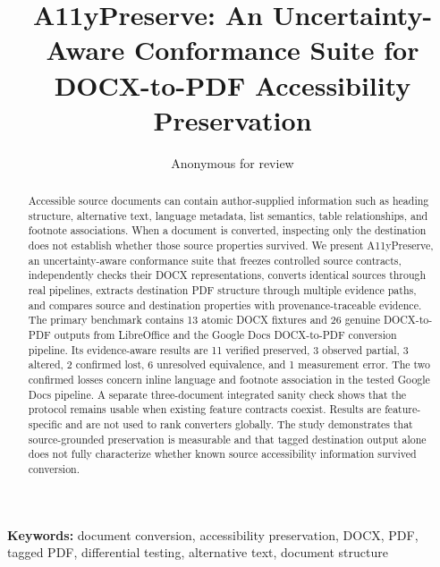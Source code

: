 \documentclass[10pt,twocolumn]{article}
\title{A11yPreserve: An Uncertainty-Aware Conformance Suite for DOCX-to-PDF Accessibility Preservation}
\author{Anonymous for review}
\date{}
\begin{document}
\maketitle

\begin{abstract}
Accessible source documents can contain author-supplied information such as heading structure, alternative text, language metadata, list semantics, table relationships, and footnote associations. When a document is converted, inspecting only the destination does not establish whether those source properties survived. We present A11yPreserve, an uncertainty-aware conformance suite that freezes controlled source contracts, independently checks their DOCX representations, converts identical sources through real pipelines, extracts destination PDF structure through multiple evidence paths, and compares source and destination properties with provenance-traceable evidence. The primary benchmark contains 13 atomic DOCX fixtures and 26 genuine DOCX-to-PDF outputs from LibreOffice and the Google Docs DOCX-to-PDF conversion pipeline. Its evidence-aware results are 11 verified preserved, 3 observed partial, 3 altered, 2 confirmed lost, 6 unresolved equivalence, and 1 measurement error. The two confirmed losses concern inline language and footnote association in the tested Google Docs pipeline. A separate three-document integrated sanity check shows that the protocol remains usable when existing feature contracts coexist. Results are feature-specific and are not used to rank converters globally. The study demonstrates that source-grounded preservation is measurable and that tagged destination output alone does not fully characterize whether known source accessibility information survived conversion.
\end{abstract}

\noindent\textbf{Keywords:} document conversion, accessibility preservation, DOCX, PDF, tagged PDF, differential testing, alternative text, document structure












\end{document}
